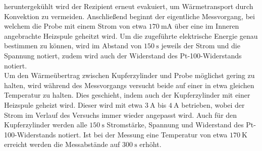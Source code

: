 heruntergekühlt wird der Rezipient erneut evakuiert, um Wärmetransport
durch Konvektion zu vermeiden. Anschließend beginnt der eigentliche
Messvorgang, bei welchem die Probe mit einem Strom von etwa $\SI{170}{\milli\ampere}$
über eine im Inneren angebrachte Heizspule geheitzt wird. Um die zugeführte elektrische
Energie genau bestimmen zu können, wird im Abstand von $\SI{150}{\second}$ jeweils
der Strom und die Spannung notiert, zudem wird auch der Widerstand des Pt-100-Widerstands
notiert. \\
Um den Wärmeübertrag zwischen Kupferzylinder und Probe möglichst gering zu halten,
wird während des Messvorgangs versucht beide auf einer in etwa gleichen Temperatur zu
halten. Dies geschieht, indem auch der Kupferzylinder mit einer Heizspule geheizt wird.
Dieser wird
mit etwa $\SI{3}{\ampere}$ bis $\SI{4}{\ampere}$ betrieben, wobei der Strom
im Verlauf des Versuchs immer wieder angepasst wird. Auch für den Kupferzylinder
werden alle $\SI{150}{\second}$ Stromstärke, Spannung und Widerstand des
Pt-100-Widerstands notiert. Ist bei der Messung eine Temperatur von etwa
$\SI{170}{\kelvin}$ erreicht werden die Messabstände auf $\SI{300}{\second}$ erhöht.
